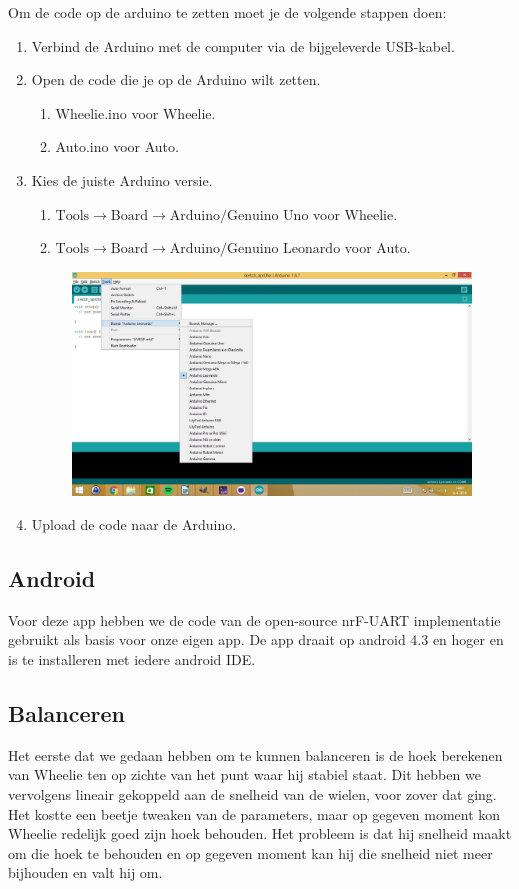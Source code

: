 \documentclass[12pt,a4paper]{article}
\begin{document}
\newpage
Om de code op de arduino te zetten moet je de volgende stappen doen:
\begin{enumerate}
	\item Verbind de Arduino met de computer via de bijgeleverde USB-kabel.
	\item Open de code die je op de Arduino wilt zetten.
		\begin{enumerate}
			\item Wheelie.ino voor Wheelie.
			\item Auto.ino voor Auto.
		\end{enumerate}
	\item Kies de juiste Arduino versie.  
	\begin{enumerate}
		\item $ \text{Tools} \rightarrow \text{Board} \rightarrow \text{Arduino/Genuino Uno} $ voor Wheelie.
		\item $ \text{Tools} \rightarrow \text{Board} \rightarrow \text{Arduino/Genuino Leonardo} $ voor Auto.
	\end{enumerate}	
	\begin{figure}[h]
		\centering
		\includegraphics[width=0.7\linewidth]{board_selecteren}
		\label{fig:board_selecteren}
	\end{figure}
	\item Upload de code naar de Arduino.		
\end{enumerate}

\subsection{Android}
Voor deze app hebben we de code van de open-source nrF-UART implementatie \cite{nrf_ua} gebruikt als basis voor onze eigen app. 
De app draait op android 4.3 en hoger en is te installeren met iedere android IDE. 

\subsection{Balanceren}
Het eerste dat we gedaan hebben om te kunnen balanceren is de hoek berekenen van
Wheelie ten op zichte van het punt waar hij stabiel staat. Dit hebben we
vervolgens lineair gekoppeld aan de snelheid van de wielen, voor zover dat ging.
Het kostte een beetje tweaken van de parameters, maar op gegeven moment kon
Wheelie redelijk goed zijn hoek behouden. Het probleem is dat hij snelheid maakt
om die hoek te behouden en op gegeven moment kan hij die snelheid niet meer
bijhouden en valt hij om.
\end{document}
